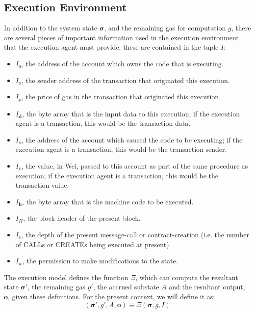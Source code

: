 \documentclass[9pt,oneside]{amsart}
\begin{document}
\begin{multicols}{2}
\subsection{Execution Environment}

In addition to the system state $\boldsymbol{\sigma}$, and the remaining gas for computation $g$, there are several pieces of important information used in the execution environment that the execution agent must provide; these are contained in the tuple $I$:

\begin{itemize}
\item $I_a$, the address of the account which owns the code that is executing.
\item $I_o$, the sender address of the transaction that originated this execution.
\item $I_p$, the price of gas in the transaction that originated this execution.
\item $I_\mathbf{d}$, the byte array that is the input data to this execution; if the execution agent is a transaction, this would be the transaction data.
\item $I_s$, the address of the account which caused the code to be executing; if the execution agent is a transaction, this would be the transaction sender.
\item $I_v$, the value, in Wei, passed to this account as part of the same procedure as execution; if the execution agent is a transaction, this would be the transaction value.
\item $I_\mathbf{b}$, the byte array that is the machine code to be executed.
\item $I_H$, the block header of the present block.
\item $I_e$, the depth of the present message-call or contract-creation (i.e. the number of {\small CALL}s or {\small CREATE}s being executed at present).
\item $I_w$, the permission to make modifications to the state.
\end{itemize}

The execution model defines the function $\Xi$, which can compute the resultant state $\boldsymbol{\sigma}'$, the remaining gas $g'$, the accrued substate $A$ and the resultant output, $\mathbf{o}$, given these definitions. For the present context, we will define it as:
\begin{equation}
(\boldsymbol{\sigma}', g', A, \mathbf{o}) \equiv \Xi(\boldsymbol{\sigma}, g, I)
\end{equation}


\end{multicols}
\end{document}
